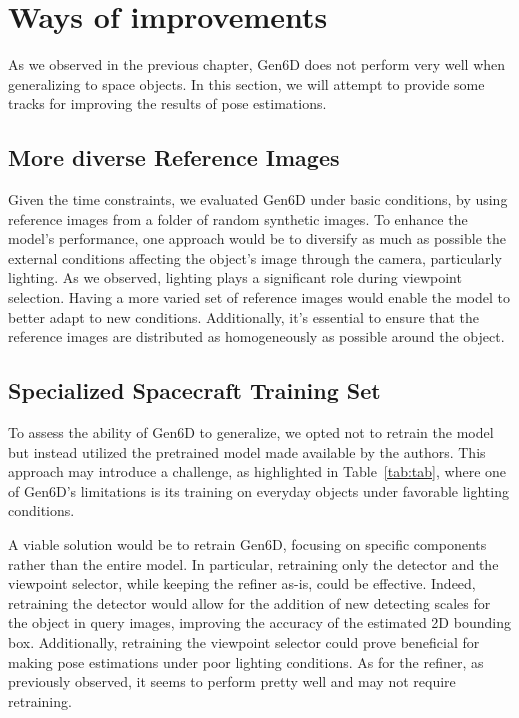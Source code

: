 
\chapter{Ways of improvements}\label{chapter:ways_of_improvements}

As we observed in the previous chapter, Gen6D does not perform very well when generalizing to space objects. In this section, we will attempt to provide some tracks for improving the results of pose estimations.

\section{More diverse Reference Images}

Given the time constraints, we evaluated Gen6D under basic conditions, by using reference images from a folder of random synthetic images. To enhance the model's performance, one approach would be to diversify as much as possible the external conditions affecting the object's image through the camera, particularly lighting. As we observed, lighting plays a significant role during viewpoint selection. Having a more varied set of reference images would enable the model to better adapt to new conditions. Additionally, it's essential to ensure that the reference images are distributed as homogeneously as possible around the object. 

\section{Specialized Spacecraft Training Set}

To assess the ability of Gen6D to generalize, we opted not to retrain the model but instead utilized the pretrained model made available by the authors. This approach may introduce a challenge, as highlighted in Table~\ref{tab:tab}, where one of Gen6D's limitations is its training on everyday objects under favorable lighting conditions.

A viable solution would be to retrain Gen6D, focusing on specific components rather than the entire model. In particular, retraining only the detector and the viewpoint selector, while keeping the refiner as-is, could be effective. Indeed, retraining the detector would allow for the addition of new detecting scales for the object in query images, improving the accuracy of the estimated 2D bounding box. Additionally, retraining the viewpoint selector could prove beneficial for making pose estimations under poor lighting conditions. As for the refiner, as previously observed, it seems to perform pretty well and may not require retraining.

